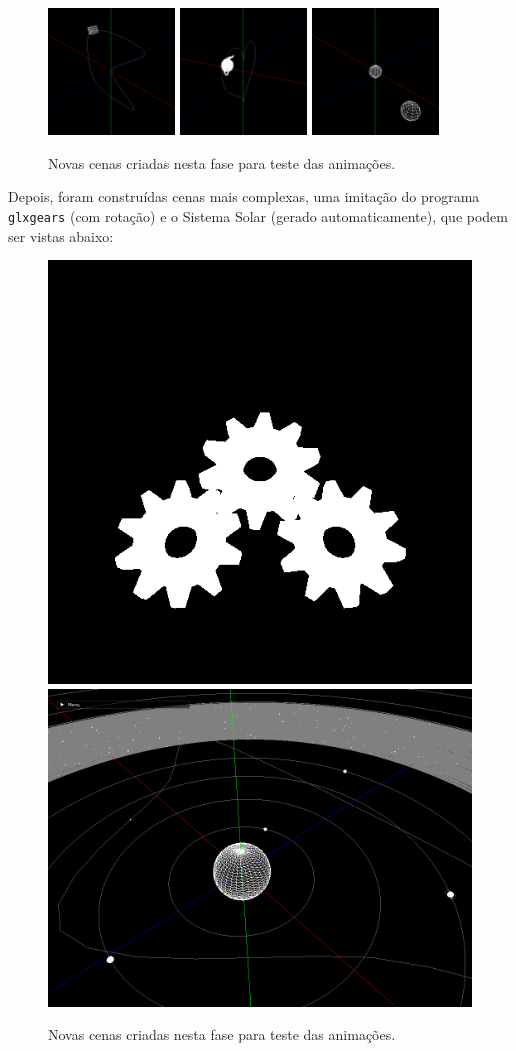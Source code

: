 \documentclass[12pt, a4paper]{article}
\begin{document}
\begin{figure}[H]
    \centering
    \includegraphics[width=0.30\textwidth]{res/phase3/results/Translation.png}
    \includegraphics[width=0.30\textwidth]{res/phase3/results/TranslationHeart.png}
    \includegraphics[width=0.30\textwidth]{res/phase3/results/Rotation.png}
    \caption{Novas cenas criadas nesta fase para teste das animações.}
\end{figure}

Depois, foram construídas cenas mais complexas, uma imitação do programa \texttt{glxgears} (com
rotação) e o Sistema Solar (gerado automaticamente), que podem ser vistas abaixo:

\begin{figure}[H]
    \centering
    \includegraphics[height=0.30\textwidth]{res/phase3/results/glxgears.png}
    \includegraphics[height=0.30\textwidth]{res/phase3/results/SolarSystem.png}
    \caption{Novas cenas criadas nesta fase para teste das animações.}
\end{figure}
\end{document}
